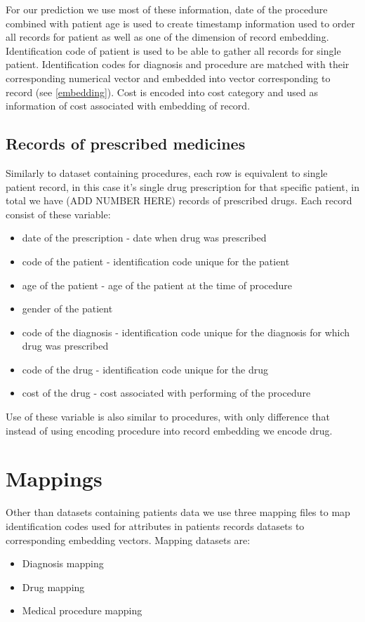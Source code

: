 For our prediction we use most of these information, date of the procedure combined with patient age is used to create timestamp information used to order all records for patient as well as one of the dimension of record embedding. Identification code of patient is used to be able to gather all records for single patient. Identification codes for diagnosis and procedure are matched with their corresponding numerical vector and embedded into vector corresponding to record (see \ref{embedding}). Cost is encoded into cost category and used as information of cost associated with embedding of record.

\subsection{Records of prescribed medicines}

Similarly to dataset containing procedures, each row is equivalent to single patient record, in this case it's single drug prescription for that specific patient, in total we have (ADD NUMBER HERE) records of prescribed drugs. Each record consist of these variable:
\begin{itemize}
	\item date of the prescription - date when drug was prescribed
	\item code of the patient - identification code unique for the patient
	\item age of the patient - age of the patient at the time of procedure
	\item gender of the patient
	\item code of the diagnosis - identification code unique for the diagnosis for which drug was prescribed
	\item code of the drug - identification code unique for the drug 
	\item cost of the drug - cost associated with performing of the procedure
\end{itemize}

Use of these variable is also similar to procedures, with only difference that instead of using encoding procedure into record embedding we encode drug.

\section{Mappings}

Other than datasets containing patients data we use three mapping files to map identification codes used for attributes in patients records datasets to corresponding embedding vectors. Mapping datasets are:
\begin{itemize}
	\item Diagnosis mapping
	\item Drug mapping
	\item Medical procedure mapping
\end{itemize}

